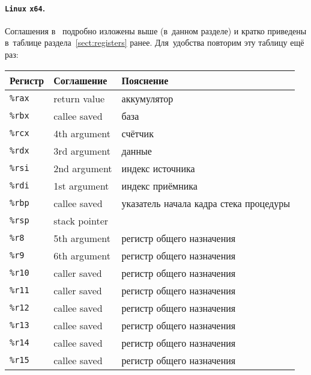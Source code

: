 {\newcommand{\Reg}[1]{\texttt{\small \%#1}}

\paragraph{\texttt{Linux} \texttt{x64}.}
Соглашения в~ подробно изложены выше (в~данном разделе) и кратко приведены в~таблице раздела~\ref{sect:registers} ранее. Для~удобства повторим эту таблицу ещё раз:
{\small\ttfamily\begin{longtable}[l]{@{}lll@{}}
\toprule
  Регистр & Соглашение & Пояснение \\
\endfirsthead
\midrule
  \Reg{rax} & return value & аккумулятор \\
  \Reg{rbx} & callee saved & база \\
  \Reg{rcx} & 4th argument & счётчик \\
  \Reg{rdx} & 3rd argument & данные \\[0.2em]
%
  \Reg{rsi} & 2nd argument & индекс источника \\
  \Reg{rdi} & 1st argument & индекс приёмника \\
  \Reg{rbp} & callee saved & указатель начала кадра стека процедуры \\
  \Reg{rsp} & stack pointer & \\[0.2em]
%
  \Reg{r8}  & 5th argument & регистр общего назначения \\
  \Reg{r9}  & 6th argument & регистр общего назначения \\
  \Reg{r10} & caller saved & регистр общего назначения \\
  \Reg{r11} & caller saved & регистр общего назначения \\[0.2em]
%
  \Reg{r12} & callee saved & регистр общего назначения \\
  \Reg{r13} & callee saved & регистр общего назначения \\
  \Reg{r14} & callee saved & регистр общего назначения \\
  \Reg{r15} & callee saved & регистр общего назначения \\
\bottomrule
\end{longtable}}



}
